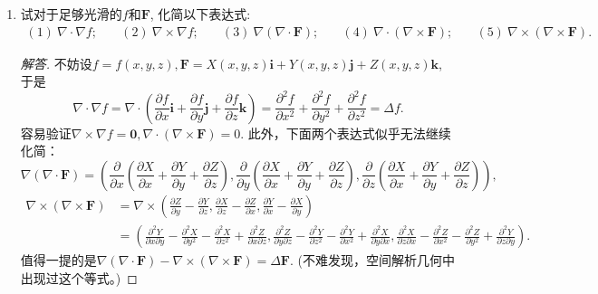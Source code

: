\begin{quiza}
\begin{enumerate}
\item 试对于足够光滑的\(f\)和\(\boldsymbol{F}\), 化简以下表达式:
\begin{align*}
(1)\ \nabla\cdot\nabla f;\quad&(2)\ \nabla\times\nabla f;\quad&
(3)\ \nabla\left(\nabla\cdot\boldsymbol{F}\right);\quad&
(4)\ \nabla\cdot\left(\nabla\times\boldsymbol{F}\right);\quad&
(5)\ \nabla\times\left(\nabla\times\boldsymbol{F}\right).
\end{align*}
\begin{proof}[解答]
不妨设\(f=f(x,y,z),\boldsymbol{F}=X(x,y,z)\boldsymbol{i}
+Y(x,y,z)\boldsymbol{j}+Z(x,y,z)\boldsymbol{k}\), 于是
\[\nabla\cdot\nabla f=\nabla\cdot\left(\frac{\partial f}{\partial x}\boldsymbol{i}
+\frac{\partial f}{\partial y}\boldsymbol{j}
+\frac{\partial f}{\partial z}\boldsymbol{k}\right)
=\frac{\partial^2f}{\partial x^2}+\frac{\partial^2f}{\partial y^2}
+\frac{\partial^2f}{\partial z^2}=\Delta f.\]
容易验证\(\nabla\times\nabla f=\boldsymbol{0},
\nabla\cdot\left(\nabla\times\boldsymbol{F}\right)=0\). 此外，下面两个表达式似乎无法继续化简：
\[\nabla\left(\nabla\cdot\boldsymbol{F}\right)
=\left(\frac{\partial}{\partial x}\left(\frac{\partial X}{\partial x}+\frac{\partial Y}{\partial y}+\frac{\partial Z}{\partial z}\right),
\frac{\partial}{\partial y}\left(\frac{\partial X}{\partial x}+\frac{\partial Y}{\partial y}+\frac{\partial Z}{\partial z}\right),
\frac{\partial}{\partial z}\left(\frac{\partial X}{\partial x}+\frac{\partial Y}{\partial y}+\frac{\partial Z}{\partial z}\right)\right),\]
\[\begin{split}
\nabla\times\left(\nabla\times\boldsymbol{F}\right)
&=\nabla\times\left(\frac{\partial Z}{\partial y}
-\frac{\partial Y}{\partial z},\frac{\partial X}{\partial z}
-\frac{\partial Z}{\partial x},\frac{\partial Y}{\partial x}
-\frac{\partial X}{\partial y}\right)\\
&=\left(\frac{\partial^2Y}{\partial x\partial y}-\frac{\partial^2X}{\partial y^2}-\frac{\partial^2X}{\partial z^2}+\frac{\partial^2Z}{\partial x\partial z},
\frac{\partial^2Z}{\partial y\partial z}-\frac{\partial^2Y}{\partial z^2}-\frac{\partial^2Y}{\partial x^2}+\frac{\partial^2X}{\partial y\partial x},
\frac{\partial^2X}{\partial z\partial x}-\frac{\partial^2Z}{\partial x^2}-\frac{\partial^2Z}{\partial y^2}+\frac{\partial^2Y}{\partial z\partial y}\right).
\end{split}\]值得一提的是\(\nabla\left(\nabla\cdot\boldsymbol{F}\right)
-\nabla\times\left(\nabla\times\boldsymbol{F}\right)=\Delta\boldsymbol{F}\).
(不难发现，空间解析几何中出现过这个等式。)
\end{proof}


\end{enumerate}
\end{quiza}
